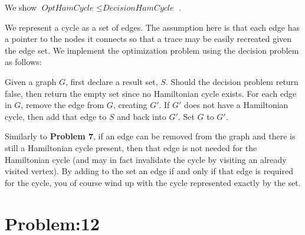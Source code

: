 \documentclass[12pt]{article}
\begin{document}
We show $ \textit{OptHamCycle } \leq \textit{DecisionHamCycle }$.

We represent a cycle as a set of edges. The assumption here is that each edge has a pointer to the nodes it connects so that a trace may be easily recreated given the edge set. We implement the optimization problem using the decision problem as follows:

Given a graph $G$, first declare a result set, $S$. Should the decision problem return false, then return the empty set since no Hamiltonian cycle exists. For each edge in $G$, remove the edge from $G$, creating $G'$. If $G'$ does not have a Hamiltonian cycle, then add that edge to $S$ and back into $G'$. Set $G$ to $G'$.

Similarly to \textbf{Problem 7}, if an edge can be removed from the graph and there is still a Hamiltonian cycle present, then that edge is not needed for the Hamiltonian cycle (and may in fact invalidate the cycle by visiting an already visited vertex). By adding to the set an edge if and only if that edge is required for the cycle, you of course wind up with the cycle represented exactly by the set.

\section*{Problem:12}
\end{document}
